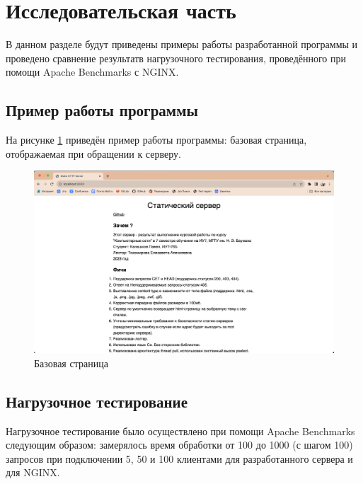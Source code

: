 \section{\large Исследовательская часть}
\label{cha:research}

В данном разделе будут приведены примеры работы разработанной программы и проведено сравнение результатв нагрузочного тестирования, проведённого при помощи Apache Benchmarks с NGINX.


\subsection{Пример работы программы}

На рисунке \ref{fig:example} приведён пример работы программы: базовая страница, отображаемая при обращении к серверу.
\begin{figure}[h]
	\centering
	\captionsetup{justification=centering}
	\includegraphics[width=170mm]{img/example.png}
	\caption{Базовая страница}
	\label{fig:example}
\end{figure}

\subsection{Нагрузочное тестирование}

Нагрузочное тестирование было осуществлено при помощи Apache \linebreak Benchmarks следующим образом: замерялось время обработки от 100 до 1000 (с шагом 100) запросов при подключении 5, 50 и 100 клиентами для разработанного сервера и для NGINX. 


